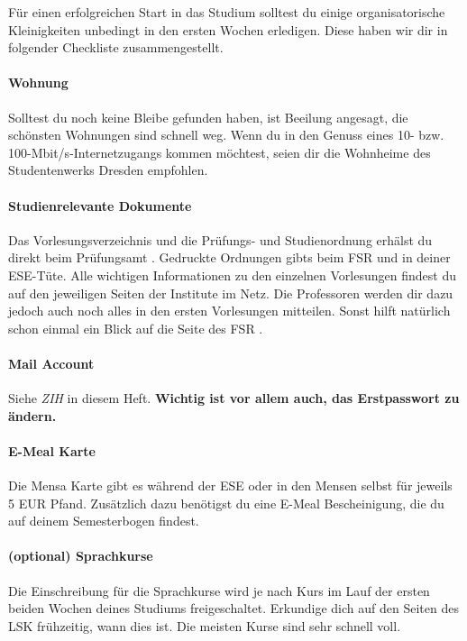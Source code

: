
Für einen erfolgreichen Start in das Studium solltest du einige organisatorische Kleinigkeiten unbedingt in den ersten Wochen erledigen.
Diese haben wir dir in folgender Checkliste zusammengestellt.


\paragraph{Wohnung}
Solltest du noch keine Bleibe gefunden haben, ist Beeilung angesagt, die schönsten Wohnungen sind schnell weg.
Wenn du in den Genuss eines 10- bzw. 100-Mbit/s-Internetzugangs kommen möchtest, seien dir die Wohnheime \link des Studentenwerks Dresden empfohlen.

\paragraph{Studienrelevante Dokumente}
Das Vorlesungsverzeichnis und die Prüfungs- und Studienordnung erhälst du direkt beim Prüfungsamt \link.
Gedruckte Ordnungen gibts beim FSR und in deiner ESE-Tüte.
Alle wichtigen Informationen zu den einzelnen Vorlesungen findest du auf den jeweiligen Seiten der Institute im Netz.
Die Professoren werden dir dazu jedoch auch noch alles in den ersten Vorlesungen mitteilen. Sonst hilft natürlich schon einmal ein Blick auf die Seite des FSR \link.

\paragraph{Mail Account}
Siehe \textit{ZIH} in diesem Heft.
\textbf{Wichtig ist vor allem auch, das Erstpasswort zu ändern.}

\paragraph{E-Meal Karte}
Die Mensa Karte gibt es während der ESE oder in den Mensen selbst für jeweils 5 EUR Pfand.
Zusätzlich dazu benötigst du eine E-Meal Bescheinigung, die du auf deinem Semesterbogen findest.

\paragraph{(optional) Sprachkurse}
Die Einschreibung für die Sprachkurse wird je nach Kurs im Lauf der ersten beiden Wochen deines Studiums freigeschaltet.
Erkundige dich auf den Seiten des LSK \link frühzeitig, wann dies ist. Die meisten Kurse sind sehr schnell voll.

